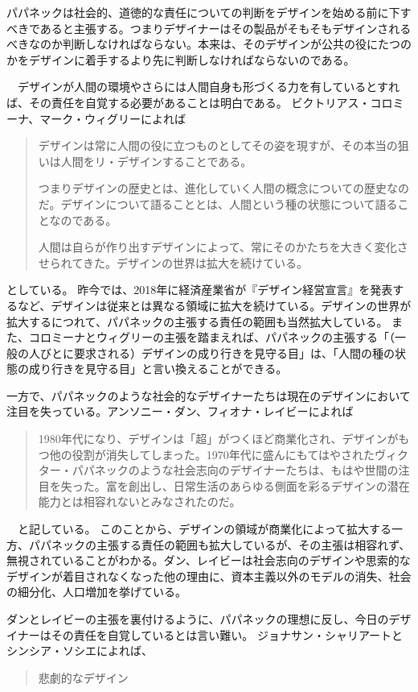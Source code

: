 \documentclass{jsarticle}
\begin{document}
パパネックは社会的、道徳的な責任についての判断をデザインを始める前に下すべきであると主張する。つまりデザイナーはその製品がそもそもデザインされるべきなのか判断しなければならない。本来は、そのデザインが公共の役にたつのかをデザインに着手するより先に判断しなければならないのである。

　デザインが人間の環境やさらには人間自身も形づくる力を有しているとすれば、その責任を自覚する必要があることは明白である。
ビクトリアス・コロミーナ、マーク・ウィグリー\cite{arewehuman}によれば
\begin{quotation}
  デザインは常に人間の役に立つものとしてその姿を現すが、その本当の狙いは人間をリ・デザインすることである。

  つまりデザインの歴史とは、進化していく人間の概念についての歴史なのだ。デザインについて語ることとは、人間という種の状態について語ることなのである。

  人間は自らが作り出すデザインによって、常にそのかたちを大きく変化させられてきた。デザインの世界は拡大を続けている。
\end{quotation}
としている。
昨今では、2018年に経済産業省が『デザイン経営宣言』を発表するなど、デザインは従来とは異なる領域に拡大を続けている。デザインの世界が拡大するにつれて、パパネックの主張する責任の範囲も当然拡大している。
また、コロミーナとウィグリーの主張を踏まえれば、パパネックの主張する「（一般の人びとに要求される）デザインの成り行きを見守る目」は、「人間の種の状態の成り行きを見守る目」と言い換えることができる。

一方で、パパネックのような社会的なデザイナーたちは現在のデザインにおいて注目を失っている。アンソニー・ダン、フィオナ・レイビー\cite{Speculative}によれば
\begin{quotation}
  1980年代になり、デザインは「超」がつくほど商業化され、デザインがもつ他の役割が消失してしまった。1970年代に盛んにもてはやされたヴィクター・パパネックのような社会志向のデザイナーたちは、もはや世間の注目を失った。富を創出し、日常生活のあらゆる側面を彩るデザインの潜在能力とは相容れないとみなされたのだ。
\end{quotation}
　と記している。
このことから、デザインの領域が商業化によって拡大する一方、パパネックの主張する責任の範囲も拡大しているが、その主張は相容れず、無視されていることがわかる。ダン、レイビーは社会志向のデザインや思索的なデザインが着目されなくなった他の理由に、資本主義以外のモデルの消失、社会の細分化、人口増加を挙げている。


ダンとレイビーの主張を裏付けるように、パパネックの理想に反し、今日のデザイナーはその責任を自覚しているとは言い難い。
ジョナサン・シャリアートとシンシア・ソシエ\cite{tragetic}によれば、
\begin{quotation}
  悲劇的なデザイン
\end{quotation}
\end{document}
